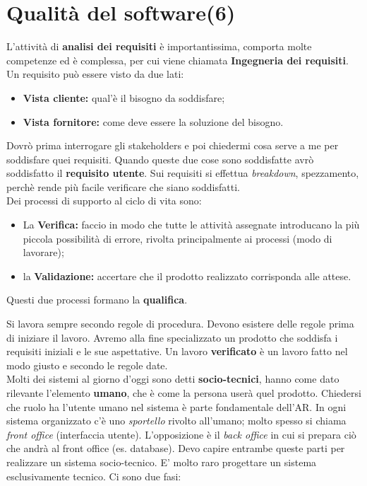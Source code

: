 


\section{Qualità del software(6)}

L'attività di \textbf{analisi dei requisiti} è importantissima, comporta molte competenze ed è complessa, per cui viene chiamata \textbf{Ingegneria dei requisiti}. Un requisito può essere visto da due lati:

\begin{itemize}

	\item \textbf{Vista cliente:} qual'è il bisogno da soddisfare;
	\item \textbf{Vista fornitore:} come deve essere la soluzione del bisogno.

\end{itemize}

Dovrò prima interrogare gli stakeholders e poi chiedermi cosa serve a me per soddisfare quei requisiti. Quando queste due cose sono soddisfatte avrò soddisfatto il \textbf{requisito utente}. Sui requisiti si effettua \textit{breakdown}, spezzamento, perchè rende più facile verificare che siano soddisfatti.\\

Dei processi di supporto al ciclo di vita sono:
\begin{itemize}

	\item La \textbf{Verifica:} faccio in modo che tutte le attività assegnate introducano la più piccola possibilità di errore, rivolta principalmente ai processi (modo di lavorare);
	\item la \textbf{Validazione:} accertare che il prodotto realizzato corrisponda alle attese.

\end{itemize}

Questi due processi formano la \textbf{qualifica}.

Si lavora sempre secondo regole di procedura. Devono esistere delle regole prima di iniziare il lavoro. Avremo alla fine specializzato un prodotto che soddisfa i requisiti iniziali e le sue aspettative. Un lavoro \textbf{verificato} è un lavoro fatto nel modo giusto e secondo le regole date. \\
Molti dei sistemi al giorno d'oggi sono detti \textbf{socio-tecnici}, hanno come dato rilevante l'elemento \textbf{umano}, che è come la persona userà quel prodotto. Chiedersi che ruolo ha l'utente umano nel sistema è parte fondamentale dell'AR. In ogni sistema organizzato c'è uno \textit{sportello} rivolto all'umano; molto spesso si chiama \textit{front office} (interfaccia utente). L'opposizione è il \textit{back office} in cui si prepara ciò che andrà al front office (es. database). Devo capire entrambe queste parti per realizzare un sistema socio-tecnico. E' molto raro progettare un sistema esclusivamente tecnico. Ci sono due fasi:

